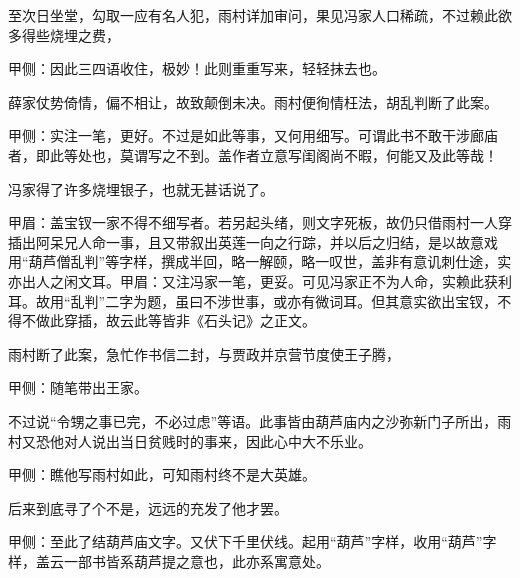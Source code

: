 \begin{parag}
    至次日坐堂，勾取一应有名人犯，雨村详加审问，果见冯家人口稀疏，不过赖此欲多得些烧埋之费，\begin{note}甲侧：因此三四语收住，极妙！此则重重写来，轻轻抹去也。\end{note}薛家仗势倚情，偏不相让，故致颠倒未决。雨村便徇情枉法，胡乱判断了此案。\begin{note}甲侧：实注一笔，更好。不过是如此等事，又何用细写。可谓此书不敢干涉廊庙者，即此等处也，莫谓写之不到。盖作者立意写闺阁尚不暇，何能又及此等哉！\end{note}冯家得了许多烧埋银子，也就无甚话说了。\begin{note}甲眉：盖宝钗一家不得不细写者。若另起头绪，则文字死板，故仍只借雨村一人穿插出阿呆兄人命一事，且又带叙出英莲一向之行踪，并以后之归结，是以故意戏用“葫芦僧乱判”等字样，撰成半回，略一解颐，略一叹世，盖非有意讥刺仕途，实亦出人之闲文耳。甲眉：又注冯家一笔，更妥。可见冯家正不为人命，实赖此获利耳。故用“乱判”二字为题，虽曰不涉世事，或亦有微词耳。但其意实欲出宝钗，不得不做此穿插，故云此等皆非《石头记》之正文。\end{note}雨村断了此案，急忙作书信二封，与贾政并京营节度使王子腾，\begin{note}甲侧：随笔带出王家。\end{note}不过说“令甥之事已完，不必过虑”等语。此事皆由葫芦庙内之沙弥新门子所出，雨村又恐他对人说出当日贫贱时的事来，因此心中大不乐业。\begin{note}甲侧：瞧他写雨村如此，可知雨村终不是大英雄。\end{note}后来到底寻了个不是，远远的充发了他才罢。\begin{note}甲侧：至此了结葫芦庙文字。又伏下千里伏线。起用“葫芦”字样，收用“葫芦”字样，盖云一部书皆系葫芦提之意也，此亦系寓意处。\end{note}
\end{parag}


